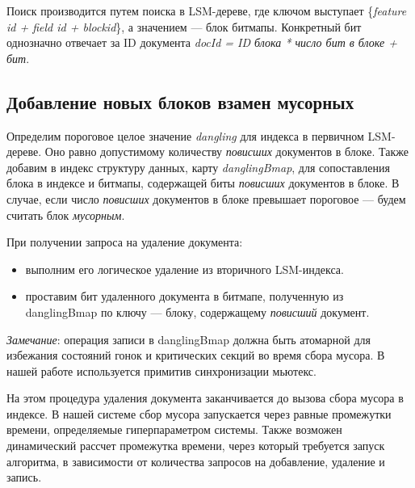 Поиск производится путем поиска в LSM-дереве, где ключом выступает
\{\textit{feature id + field id + blockid}\}, а значением — блок битмапы.
Конкретный бит однозначно отвечает за ID документа \textit{docId = ID блока * число бит в блоке
+ бит}.

\subsection{Добавление новых блоков взамен мусорных}

Определим пороговое целое значение \textit{dangling} для индекса в первичном
LSM-дереве. Оно равно допустимому количеству \textit{повисших} документов в
блоке. Также добавим в индекс структуру данных, карту \textit{danglingBmap}, для сопоставления
блока в индексе и битмапы, содержащей биты \textit{повисших} документов в блоке.
В случае, если число \textit{повисших} документов в блоке превышает пороговое —
будем считать блок \textit{мусорным}.

При получении запроса на удаление документа:
\begin{itemize}
    \item выполним его логическое удаление из вторичного LSM-индекса.
    \item проставим бит удаленного документа в битмапе, полученную из danglingBmap
    по ключу — блоку, содержащему \textit{повисший} документ.
\end{itemize}

\textit{Замечание}: операция записи в danglingBmap должна быть атомарной для 
избежания состояний гонок и критических секций во время сбора мусора. В нашей
работе используется примитив синхронизации мьютекс.

На этом процедура удаления документа заканчивается до вызова сбора мусора в индексе.
В нашей системе сбор мусора запускается через равные промежутки времени, определяемые 
гиперпараметром системы. Также возможен динамический рассчет промежутка времени,
через который требуется запуск алгоритма, в зависимости от количества запросов на
добавление, удаление и запись.

